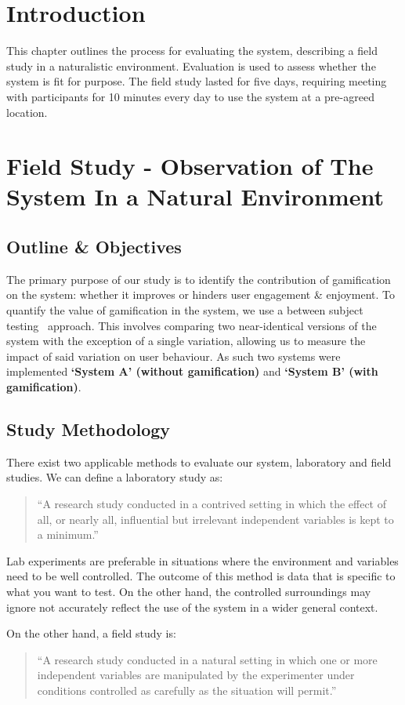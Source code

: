 \section{Introduction}
This chapter outlines the process for evaluating the system, describing a field study in a naturalistic environment. Evaluation is used to assess whether the system is fit for purpose. The field study lasted for five days, requiring meeting with participants for 10 minutes every day to use the system at a pre-agreed location.
\section{Field Study - Observation of The System In a Natural Environment}
\subsection{Outline \& Objectives}
The primary purpose of our study is to identify the contribution of gamification on the system: whether it improves or hinders user engagement \& enjoyment. To quantify the value of gamification in the system, we use a between subject testing~\cite{ABTesting} approach. This involves comparing two near-identical versions of the system with the exception of a single variation, allowing us to measure the impact of said variation on user behaviour. As such two systems were implemented \textbf{`System A' (without gamification)} and \textbf{`System B' (with gamification)}.

\subsection{Study Methodology}
There exist two applicable methods to evaluate our system, laboratory and field studies. We can define a laboratory study as:
\begin{quotation}
\noindent
``A research study conducted in a contrived setting in which the effect of all, or nearly all, influential but irrelevant independent variables is kept to a minimum.''~\cite[p.~215]{marketStudy}
 \end{quotation}

Lab experiments are preferable in situations where the environment and variables need to be well controlled. The outcome of this method is data that is specific to what you want to test. On the other hand, the controlled surroundings may ignore not accurately reflect the use of the system in a wider general context.

On the other hand, a field study is:
\begin{quotation}
\noindent
``A research study conducted in a natural setting in which one or more independent variables are manipulated by the experimenter under conditions controlled as carefully as the situation will permit.''\cite[p. 211]{marketStudy}
 \end{quotation}

